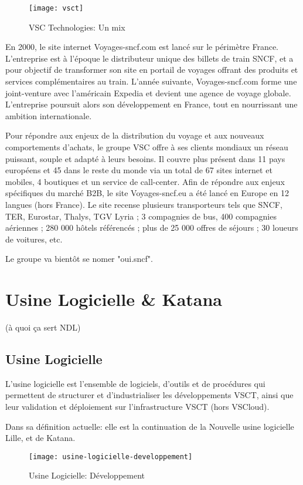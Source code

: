 \begin{figure}[ht]
\centering
\texttt{[image: vsct]}
\caption{VSC Technologies: Un mix}
\label{fig:vsct}
\end{figure}

En 2000, le site internet Voyages-sncf.com est lancé sur le périmètre France. L’entreprise est à l’époque le distributeur unique des billets de train SNCF, et a pour objectif de transformer son site en portail de voyages offrant des produits et services complémentaires au train. L’année suivante, Voyages-sncf.com forme une joint-venture avec l’américain Expedia et devient une agence de voyage globale. L’entreprise poursuit alors son développement en France, tout en nourrissant une ambition internationale.

Pour répondre aux enjeux de la distribution du voyage et aux nouveaux comportements d’achats, le groupe VSC offre à ses clients mondiaux un réseau puissant, souple et adapté à leurs besoins. Il couvre plus présent dans 11 pays européens et 45 dans le reste du monde via un total de 67 sites internet et mobiles, 4 boutiques et un service de call-center. Afin de répondre aux enjeux spécifiques du marché B2B, le site Voyages-sncf.eu a été lancé en Europe en 12 langues (hors France).
Le site recense plusieurs transporteurs tels que SNCF, TER, Eurostar, Thalys, TGV Lyria ; 3 compagnies de bus, 400 compagnies aériennes ; 280 000 hôtels référencés ; plus de 25 000 offres de séjours ; 30 loueurs de voitures, etc.

Le groupe va bientôt se nomer "oui.sncf".
\clearpage

\section{Usine Logicielle \& Katana} (à quoi ça sert NDL)
\subsection{Usine Logicielle}
L'usine logicielle est l'ensemble de logiciels, d'outils et de procédures qui permettent de structurer et d'industrialiser les développements VSCT, ainsi que leur validation et déploiement sur l'infrastructure VSCT (hors VSCloud).

Dans sa définition actuelle: elle est la continuation de la Nouvelle usine logicielle Lille, et de Katana.

\begin{figure}[ht]
\centering
\texttt{[image: usine-logicielle-developpement]}
\caption{Usine Logicielle: Développement}
\end{figure}

